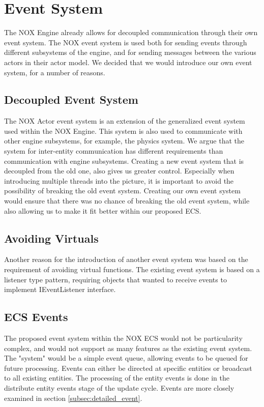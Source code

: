 \section{Event System}
The NOX Engine already allows for decoupled communication through their own event system.
The NOX event system is used both for sending events through different subsystems of the engine, and for sending messages between the various actors in their actor model.
We decided that we would introduce our own event system, for a number of reasons.

\subsection{Decoupled Event System}
The NOX Actor event system is an extension of the generalized event system used within the NOX Engine.
This system is also used to communicate with other engine subsystems, for example, the physics system.
We argue that the system for inter-entity communication has different requirements than communication with engine subsystems.
Creating a new event system that is decoupled from the old one, also gives us greater control.
Especially when introducing multiple threads into the picture, it is important to avoid the possibility of breaking the old event system.
Creating our own event system would ensure that there was no chance of breaking the old event system, while also allowing us to make it fit better within our proposed ECS.

\subsection{Avoiding Virtuals}
Another reason for the introduction of another event system was based on the requirement of avoiding virtual functions.
The existing event system is based on a listener type pattern, requiring objects that wanted to receive events to implement IEventListener interface.

\subsection{ECS Events}
The proposed event system within the NOX ECS would not be particularity complex, and would not support as many features as the existing event system.
The "system" would be a simple event queue, allowing events to be queued for future
processing. Events can either be directed at specific entities or broadcast to all existing entities.
The processing of the entity events is done in the distribute entity events stage of the update cycle.
Events are more closely examined in section \ref{subsec:detailed_event}.
